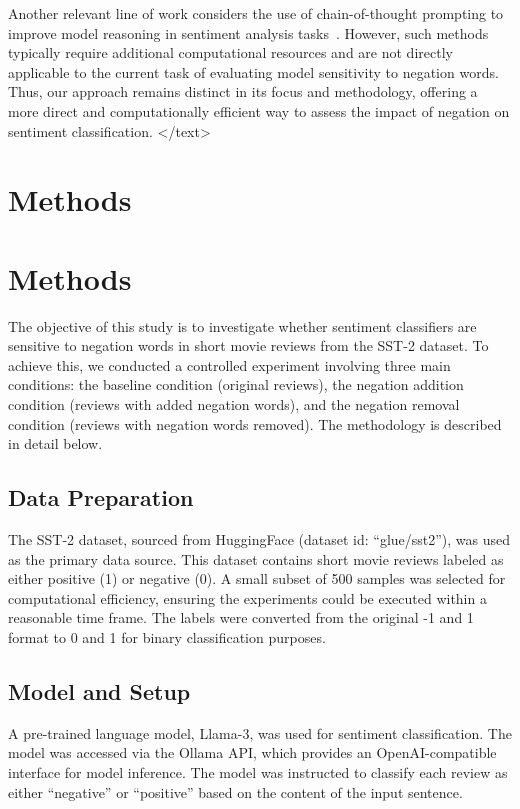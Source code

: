 \documentclass{article}
\begin{document}
Another relevant line of work considers the use of chain-of-thought prompting to improve model reasoning in sentiment analysis tasks~\cite{li2023chain}. However, such methods typically require additional computational resources and are not directly applicable to the current task of evaluating model sensitivity to negation words. Thus, our approach remains distinct in its focus and methodology, offering a more direct and computationally efficient way to assess the impact of negation on sentiment classification.
</text>
\section{Methods}
\section{Methods}

The objective of this study is to investigate whether sentiment classifiers are sensitive to negation words in short movie reviews from the SST-2 dataset. To achieve this, we conducted a controlled experiment involving three main conditions: the baseline condition (original reviews), the negation addition condition (reviews with added negation words), and the negation removal condition (reviews with negation words removed). The methodology is described in detail below.

\subsection{Data Preparation}

The SST-2 dataset, sourced from HuggingFace (dataset id: ``glue/sst2''), was used as the primary data source. This dataset contains short movie reviews labeled as either positive (1) or negative (0). A small subset of 500 samples was selected for computational efficiency, ensuring the experiments could be executed within a reasonable time frame. The labels were converted from the original -1 and 1 format to 0 and 1 for binary classification purposes.

\subsection{Model and Setup}

A pre-trained language model, Llama-3, was used for sentiment classification. The model was accessed via the Ollama API, which provides an OpenAI-compatible interface for model inference. The model was instructed to classify each review as either ``negative'' or ``positive'' based on the content of the input sentence.
\end{document}
